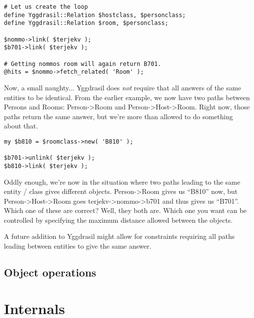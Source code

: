 \documentclass[english,a4paper]{article}
\begin{document}
\lstset{caption=Creating a loop,label=looping}
\begin{lstlisting}
# Let us create the loop
define Yggdrasil::Relation $hostclass, $personclass;
define Yggdrasil::Relation $room, $personclass;

$nommo->link( $terjekv );
$b701->link( $terjekv );

# Getting nommos room will again return B701.
@hits = $nommo->fetch_related( 'Room' );
\end{lstlisting}

Now, a small naughty...  Yggdrasil does \textit{not} require that all
answers of the same entities to be identical.  From the earlier
example, we now have two paths between Persons and Rooms: Person->Room
and Person->Host->Room.  Right now, those paths return the same
answer, but we're more than allowed to do something about that.

\lstset{caption=Two paths giving different answers,label=funpaths}
\begin{lstlisting}
my $b810 = $roomclass->new( 'B810' );

$b701->unlink( $terjekv );
$b810->link( $terjekv );
\end{lstlisting}

Oddly enough, we're now in the situation where two paths leading to
the same entity / class gives different objects.  Person->Room gives
us ``B810'' now, but Person->Host->Room goes terjekv->nommo->b701 and
thus gives us ``B701''.  Which one of these are correct?  Well, they
both are.  Which one you want can be controlled by specifying the
maximum distance allowed between the objects.   

A future addition to Yggdrasil might allow for constraints requiring
all paths leading between entities to give the same answer.  

\subsection{Object operations}

\section{Internals}
\end{document}
